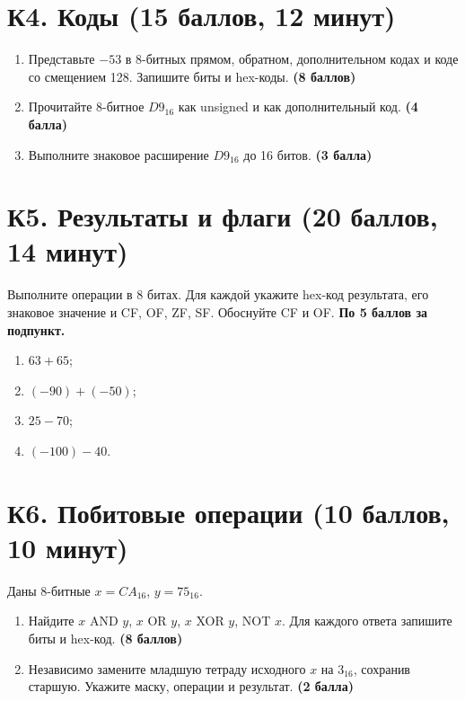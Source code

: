 \section{К4. Коды (15 баллов, 12 минут)}\label{task:k4}
\begin{enumerate}
    \item Представьте $-53$ в 8-битных прямом, обратном, дополнительном кодах и коде со смещением 128. Запишите биты и hex-коды. \textbf{(8 баллов)}
    \item Прочитайте 8-битное $D9_{16}$ как unsigned и как дополнительный код. \textbf{(4 балла)}
    \item Выполните знаковое расширение $D9_{16}$ до 16 битов. \textbf{(3 балла)}
\end{enumerate}

\section{К5. Результаты и флаги (20 баллов, 14 минут)}\label{task:k5}
Выполните операции в 8 битах. Для каждой укажите hex-код результата, его знаковое значение и CF, OF, ZF, SF. Обоснуйте CF и OF. \textbf{По 5 баллов за подпункт.}
\begin{enumerate}
    \item $63+65$;
    \item $(-90)+(-50)$;
    \item $25-70$;
    \item $(-100)-40$.
\end{enumerate}

\section{К6. Побитовые операции (10 баллов, 10 минут)}\label{task:k6}
Даны 8-битные $x=CA_{16}$, $y=75_{16}$.
\begin{enumerate}
    \item Найдите $x$ AND $y$, $x$ OR $y$, $x$ XOR $y$, NOT $x$. Для каждого ответа запишите биты и hex-код. \textbf{(8 баллов)}
    \item Независимо замените младшую тетраду исходного $x$ на $3_{16}$, сохранив старшую. Укажите маску, операции и результат. \textbf{(2 балла)}
\end{enumerate}


